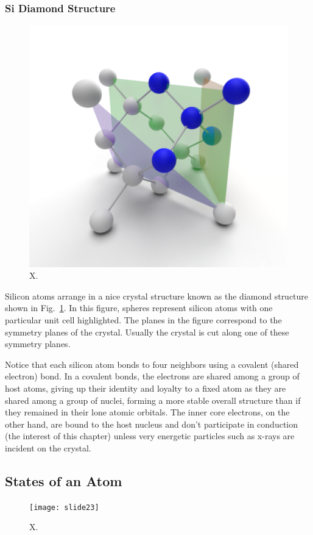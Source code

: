 \subsubsection{Si Diamond Structure}


\begin{figure}
\begin{center}
\includegraphics[width=.5\columnwidth]{silicon_crysal.png}
\end{center}
\caption{X. } \label{fig:silicon_crysal}
\end{figure}

Silicon atoms arrange in a nice crystal structure known as the diamond structure shown in Fig.~\ref{fig:silicon_crysal}.  In this figure, spheres represent silicon atoms with one particular unit cell highlighted.  The planes in the figure correspond to the symmetry planes of the crystal.  Usually the crystal is cut along one of these symmetry planes.

Notice that each silicon atom bonds to four neighbors using a covalent (shared electron) bond.  In a covalent bonds, the electrons are shared among a group of host atoms, giving up their identity and loyalty to a fixed atom as they are shared among a group of nuclei, forming a more stable overall structure than if they remained in their lone atomic orbitals.  The inner core electrons, on the other hand, are bound to the host nucleus and don't participate in conduction (the interest of this chapter) unless very energetic particles such as x-rays are incident on the crystal.  



\subsection{States of an Atom}

\begin{figure}
\begin{center}
\texttt{[image: slide23]}
\end{center}
\caption{X. } \label{fig:slide23}
\end{figure}


